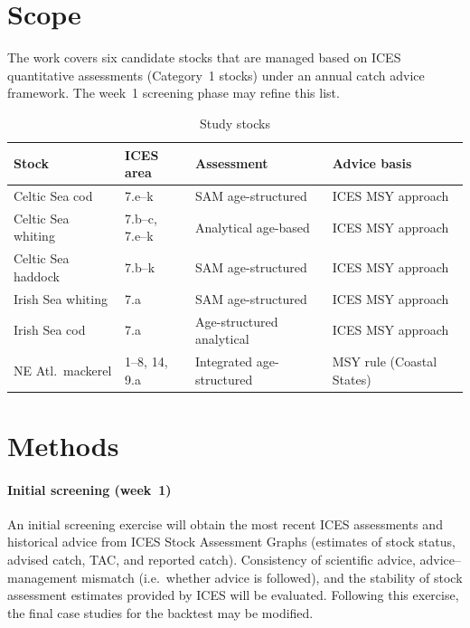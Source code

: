 \documentclass[11pt,a4paper]{extarticle}
\begin{document}
	\section*{Scope}
	
	The work covers six candidate stocks that are managed based on ICES quantitative assessments (Category~1 stocks) under an annual catch advice framework. The week~1 screening phase may refine this list.
{\footnotesize	
\begin{table}[h]
	\centering
	\small
	\caption{Study stocks}
	\begin{tabular}{@{}llll@{}}
		\toprule
		Stock & ICES area & Assessment & Advice basis \\
		\midrule
		Celtic Sea cod &
		7.e--k &
		SAM age-structured &
		ICES MSY approach \\
		
		Celtic Sea whiting &
		7.b--c, 7.e--k &
		Analytical age-based &
		ICES MSY approach \\
		
		Celtic Sea haddock &
		7.b--k &
		SAM age-structured &
		ICES MSY approach \\
		
		Irish Sea whiting &
		7.a &
		SAM age-structured &
		ICES MSY approach \\
		
		Irish Sea cod &
		7.a &
		Age-structured analytical &
		ICES MSY approach \\
		
		NE Atl.\ mackerel &
		1--8, 14, 9.a &
		Integrated age-structured &
		MSY rule (Coastal States) \\
		\bottomrule
	\end{tabular}
	\end{table}}
		
	\section*{Methods}
	
	\paragraph{Initial screening (week~1)}
	An initial screening exercise will obtain the most recent ICES assessments and historical advice from ICES Stock Assessment Graphs (estimates of stock status, advised catch, TAC, and reported catch). Consistency of scientific advice, advice--management mismatch (i.e.\ whether advice is followed), and the stability of stock assessment estimates provided by ICES will be evaluated. Following this exercise, the final case studies for the backtest may be modified.
	
\end{document}
